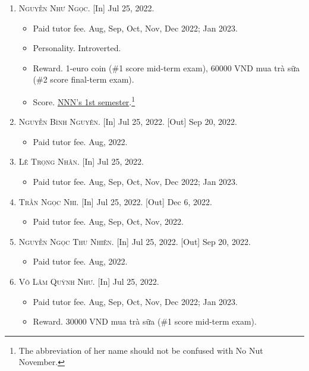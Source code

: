 \documentclass{article}
\numberwithin{equation}{section}
\begin{document}
\begin{enumerate}
\begin{itemize}
	\end{itemize}
	\item \textsc{Nguyễn Như Ngọc.} \textsf{[In]} Jul 25, 2022.
	\begin{itemize}
		\item \textsf{Paid tutor fee.} Aug, Sep, Oct, Nov, Dec 2022; Jan 2023.
		\item \textsf{Personality.} Introverted.
		\item \textsf{Reward.} 1-euro coin (\#1 score mid-term exam), 60000 VND mua trà sữa (\#2 score final-term exam).
		\item \textsf{Score.} \href{https://github.com/NQBH/hobby/blob/master/STEM/student/Nguyen_Nhu_Ngoc_grade_6_1st_semester.jpg}{NNN's 1st semester}.\footnote{The abbreviation of her name should not be confused with No Nut November.}
	\end{itemize}
	\item \textsc{Nguyễn Bình Nguyên.} \textsf{[In]} Jul 25, 2022. \textsf{[Out]} Sep 20, 2022.
	\begin{itemize}
		\item \textsf{Paid tutor fee.} Aug, 2022.
	\end{itemize}
	\item \textsc{Lê Trọng Nhân.} \textsf{[In]} Jul 25, 2022.
	\begin{itemize}
		\item \textsf{Paid tutor fee.} Aug, Sep, Oct, Nov, Dec 2022; Jan 2023.
	\end{itemize}
	\item \textsc{Trần Ngọc Nhi.} \textsf{[In]} Jul 25, 2022. \textsf{[Out]} Dec 6, 2022.
	\begin{itemize}
		\item \textsf{Paid tutor fee.} Aug, Sep, Oct, Nov, 2022.
	\end{itemize}
	\item \textsc{Nguyễn Ngọc Thu Nhiên.} \textsf{[In]} Jul 25, 2022. \textsf{[Out]} Sep 20, 2022.
	\begin{itemize}
		\item \textsf{Paid tutor fee.} Aug, 2022.
	\end{itemize}
	\item \textsc{Võ Lâm Quỳnh Như.} \textsf{[In]} Jul 25, 2022.
	\begin{itemize}
		\item \textsf{Paid tutor fee.} Aug, Sep, Oct, Nov, Dec 2022; Jan 2023.
		\item \textsf{Reward.} 30000 VND mua trà sữa (\#1 score mid-term exam).

\end{itemize}
\end{enumerate}
\end{document}
